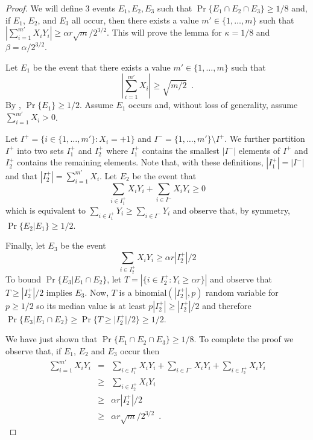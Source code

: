 \documentclass[acmtoalg]{acmtrans2m}
\begin{document}
\begin{proof}
We will define 3 events $E_1,E_2,E_3$ such that
$\Pr\{E_1\cap E_2\cap E_3\} \ge 1/8$ and, if $E_1$, $E_2$, and $E_3$
all occur, then there exists a value $m'\in\{1,\ldots,m\}$ such that
$\left|\sum_{i=1}^{m'}
X_iY_i\right| \ge \alpha r \sqrt{m}/2^{3/2}$.  This will prove the
lemma for $\kappa = 1/8$ and $\beta = \alpha/2^{3/2}$.

Let $E_1$ be the event that there exists a value $m'\in\{1,\ldots,m\}$
such that 
\[
   \left|\sum_{i=1}^{m'} X_i\right| \ge \sqrt{m/2} \enspace .
\]
By , $\Pr\{E_1\}\ge 1/2$.  Assume $E_1$ occurs
and, without loss of generality, assume $\sum_{i=1}^{m'} X_i > 0$.

Let $I^{+} = \{i\in\{1,\ldots,m'\}: X_i=+1\}$ and
$I^-=\{1,\ldots,m'\}\setminus I^+$.  We further partition $I^+$ into
two sets $I^+_1$ and $I^+_2$ where $I^+_1$ contains the smallest
$|I^-|$ elements of $I^+$ and $I^+_2$ contains the remaining elements.
Note that, with these definitions, $|I^+_1|=|I^-|$ and that
$|I^+_2|=\sum_{i=1}^{m'} X_i$.  Let $E_2$ be the event that
\[
     \sum_{i\in I^+_1}X_iY_i + \sum_{i\in I^-} X_iY_i \ge 0
\]
which is equivalent to $\sum_{i\in I^+_1}Y_i \ge \sum_{i\in I^-} Y_i$
and observe that, by symmetry, $\Pr\{E_2|E_1\}\ge 1/2$.

Finally, let $E_3$ be the event
\[
   \sum_{i\in I^+_2} X_iY_i \ge \alpha r|I^+_2|/2
\]
To bound $\Pr\{E_3|E_1\cap E_2\}$, let $T=\left|\{i\in I^+_2:Y_i\ge
\alpha r\}\right|$ and observe that
$T\ge |I^+_2|/2$ implies $E_3$. Now, $T$ is a
$\mathrm{binomial}(|I^+_2|,p)$ random variable for $p\ge 1/2$ so its
median value is at least $p|I^+_2| \ge |I^+_2|/2$ and therefore
$\Pr\{E_3|E_1\cap E_2\} \ge \Pr\{T\ge |I^+_2|/2\} \ge 1/2$.

We have just shown that $\Pr\{E_1\cap E_2\cap E_3\}\ge 1/8$.  To
complete the proof we observe that, if $E_1$, $E_2$ and $E_3$ occur
then
\begin{eqnarray*}
  \sum_{i=1}^{m'} X_i Y_i 
    & = & \sum_{i\in I^+_1} X_i Y_i
           + \sum_{i\in I^-} X_i Y_i 
           + \sum_{i\in I^+_2} X_i Y_i \\
    & \ge & \sum_{i\in I^+_2} X_i Y_i \\
    & \ge & \alpha r|I^+_2|/2 \\
    & \ge & \alpha r\sqrt{m}/2^{3/2} \enspace .
\end{eqnarray*}
\end{proof}
\end{document}
